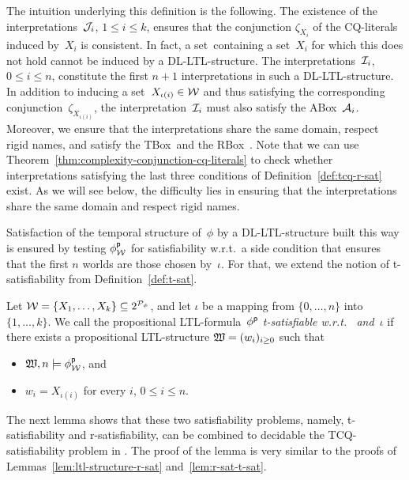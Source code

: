 \noindent
The intuition underlying this definition is the following.  The existence of the
interpretations~$\mathcal{J}_i$, $1\le i\le k$, ensures that the conjunction
$\zeta_{X_i}$ of the CQ-literals induced by~$X_i$ is consistent.  In fact, a
set~\Wmc containing a set~$X_i$ for which this does not hold cannot be induced
by a DL-LTL-structure.  The interpretations~$\mathcal{I}_i$, $0\le i\le n$, constitute
the first $n+1$ interpretations in such a DL-LTL-structure.  In addition to
inducing a set~$X_{\iota(i)}\in\mathcal{W}$ and thus satisfying the corresponding
conjunction~$\zeta_{X_{\iota(i)}}$, the interpretation~$\mathcal{I}_i$ must also
satisfy the ABox~$\mathcal{A}_i$.  Moreover, we ensure that the interpretations share
the same domain, respect rigid names, and satisfy the TBox~\Tmc and the
RBox~\Rmc.
%
Note that we can use Theorem~\ref{thm:complexity-conjunction-cq-literals} to
check whether interpretations satisfying the last three conditions of
Definition~\ref{def:tcq-r-sat} exist.  As we will see below,
the difficulty lies in ensuring that the interpretations share the same domain
and respect rigid names.

Satisfaction of the temporal structure of~$\phi$ by a DL-LTL-structure built
this way is ensured by testing $\phi^\mathsf{p}_\mathcal{W}$ for satisfiability w.r.t.\ a
side condition that ensures that the first $n$ worlds are those chosen
by~$\iota$.  For that, we extend the notion of t-satisfiability from
Definition~\ref{def:t-sat}.

\begin{definition}[T-satisfiability]\label{def:tcq-t-sat}
    Let $\mathcal{W}=\{X_1,\dots,X_k\}\subseteq 2^{\mathcal{P}_\phi}$, and let $\iota$ be a
    mapping from $\{0,\dots,n\}$ into $\{1,\dots,k\}$.  We call the
    propositional LTL-formula~$\phi^\mathsf{p}$ \emph{t-satisfiable w.r.t.~\Wmc
    and~$\iota$} if there exists a propositional LTL-structure
    $\mathfrak{W}=(w_i)_{i\ge 0}$ such that
    \begin{itemize}
        \item $\mathfrak{W},n\models\phi^\mathsf{p}_\mathcal{W}$, and
        \item $w_i=X_{\iota(i)}$ for every $i$, $0\le i\le n$.
    \end{itemize}
\end{definition}

\noindent
The next lemma shows that these two satisfiability problems, namely,
t-satisfiability and r-satisfiability, can be combined to decidable the
TCQ-satisfiability problem in \SHQ.  The proof of the lemma is very similar to
the proofs of Lemmas~\ref{lem:ltl-structure-r-sat} and~\ref{lem:r-sat-t-sat}.

